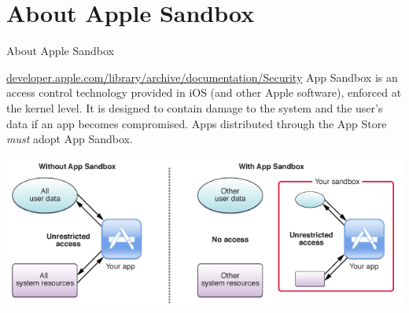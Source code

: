 \documentclass{beamer}
\begin{document}
\section{About Apple Sandbox}
\begin{frame}{About Apple Sandbox}
    \begin{block}{\small\href{https://developer.apple.com/library/archive/documentation/Security/Conceptual/AppSandboxDesignGuide/AboutAppSandbox/AboutAppSandbox.html}{developer.apple.com/library/archive/documentation/Security}}
          App Sandbox is an access control technology provided in iOS (and other Apple software), enforced at the kernel level. It is designed to contain damage to the system and the user’s data if an app becomes compromised. Apps distributed through the App Store \emph{must} adopt App Sandbox.
    \end{block}
    \includegraphics[width=\textwidth,height=\textheight,keepaspectratio]{about_sandboxing.png}
\end{frame}
\end{document}

